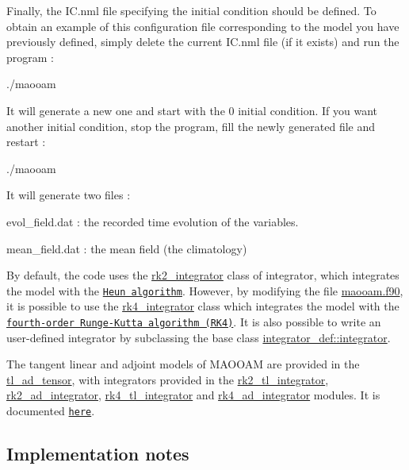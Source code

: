 Finally, the I\+C.\+nml file specifying the initial condition should be defined. To obtain an example of this configuration file corresponding to the model you have previously defined, simply delete the current I\+C.\+nml file (if it exists) and run the program \+: \begin{DoxyVerb}./maooam
\end{DoxyVerb}


It will generate a new one and start with the 0 initial condition. If you want another initial condition, stop the program, fill the newly generated file and restart \+: \begin{DoxyVerb}./maooam
\end{DoxyVerb}


It will generate two files \+:
\begin{DoxyItemize}
\item evol\+\_\+field.\+dat \+: the recorded time evolution of the variables.
\item mean\+\_\+field.\+dat \+: the mean field (the climatology)
\end{DoxyItemize}

By default, the code uses the \hyperlink{namespacerk2__integrator}{rk2\+\_\+integrator} class of integrator, which integrates the model with the \href{https://en.wikipedia.org/wiki/Heun%27s_method}{\tt Heun algorithm}. However, by modifying the file \hyperlink{maooam_8f90_source}{maooam.\+f90}, it is possible to use the \hyperlink{namespacerk4__integrator}{rk4\+\_\+integrator} class which integrates the model with the \href{https://en.wikipedia.org/wiki/Runge%E2%80%93Kutta_methods}{\tt fourth-\/order Runge-\/\+Kutta algorithm (R\+K4)}. It is also possible to write an user-\/defined integrator by subclassing the base class \hyperlink{structintegrator__def_1_1integrator}{integrator\+\_\+def\+::integrator}.

The tangent linear and adjoint models of M\+A\+O\+O\+AM are provided in the \hyperlink{namespacetl__ad__tensor}{tl\+\_\+ad\+\_\+tensor}, with integrators provided in the \hyperlink{namespacerk2__tl__integrator}{rk2\+\_\+tl\+\_\+integrator}, \hyperlink{namespacerk2__ad__integrator}{rk2\+\_\+ad\+\_\+integrator}, \hyperlink{namespacerk4__tl__integrator}{rk4\+\_\+tl\+\_\+integrator} and \hyperlink{namespacerk4__ad__integrator}{rk4\+\_\+ad\+\_\+integrator} modules. It is documented \href{./md_doc_tl_ad_doc.html}{\tt here}.





\subsection*{Implementation notes}

